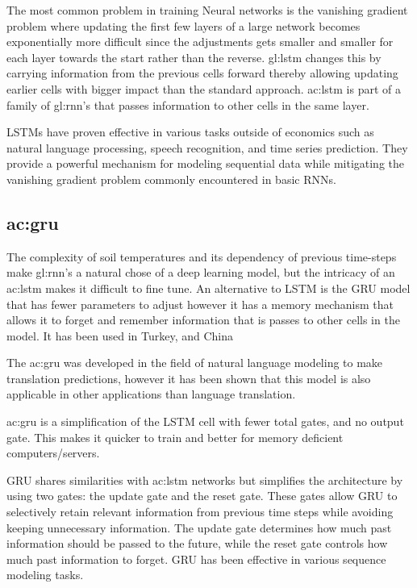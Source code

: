 The most common problem in training Neural networks is the vanishing gradient problem where updating the first few layers of a large network becomes exponentially more difficult since the adjustments gets smaller and smaller for each layer towards the start rather than the reverse. \gls{gl:lstm} changes this by carrying information from the previous cells forward thereby allowing updating earlier cells with bigger impact than the standard approach\cite{hochreiter_long_1997}. \acrshort{ac:lstm} is part of a family of \gls{gl:rnn}'s that passes information to other cells in the same layer.

LSTMs have proven effective in various tasks outside of economics such as natural language processing, speech recognition, and time series prediction. They provide a powerful mechanism for modeling sequential data while mitigating the vanishing gradient problem commonly encountered in basic RNNs.


\subsection{\acrfull{ac:gru}}

The complexity of soil temperatures and its dependency of previous time-steps make \gls{gl:rnn}'s a natural chose of a deep learning model, but the intricacy of an \acrshort{ac:lstm} makes it difficult to fine tune. An alternative to LSTM is the GRU model\cite{cho_learning_2014} that has fewer parameters to adjust however it has a memory mechanism that allows it to forget and remember information that is passes to other cells in the model. It has been used in Turkey\cite{uluocak_daily_2024}, and China\cite{li_forecasting_2024}

The \acrfull{ac:gru}\cite{cho_learning_2014} was developed in the field of natural language modeling to make translation predictions, however it has been shown that this model is also applicable in other applications than language translation. 

\acrshort{ac:gru} is a simplification of the LSTM cell with fewer total gates, and no output gate. This makes it quicker to train and better for memory deficient computers/servers.

GRU shares similarities with \acrshort{ac:lstm} networks but simplifies the architecture by using two gates: the update gate and the reset gate. These gates allow GRU to selectively retain relevant information from previous time steps while avoiding keeping unnecessary information. The update gate determines how much past information should be passed to the future, while the reset gate controls how much past information to forget. GRU has been effective in various sequence modeling tasks.

